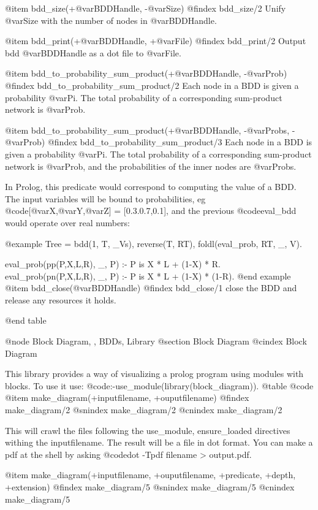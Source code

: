 @item bdd_size(+@var{BDDHandle}, -@var{Size})
@findex bdd_size/2
Unify @var{Size} with the number of nodes in @var{BDDHandle}.

@item bdd_print(+@var{BDDHandle}, +@var{File})
@findex bdd_print/2
Output bdd @var{BDDHandle} as a dot file to @var{File}.

@item bdd_to_probability_sum_product(+@var{BDDHandle}, -@var{Prob})
@findex bdd_to_probability_sum_product/2
Each node in a BDD is given a probability @var{Pi}. The total
probability of a corresponding sum-product network is @var{Prob}.

@item bdd_to_probability_sum_product(+@var{BDDHandle}, -@var{Probs}, -@var{Prob})
@findex bdd_to_probability_sum_product/3
Each node in a BDD is given a probability @var{Pi}. The total
probability of a corresponding sum-product network is @var{Prob}, and
the probabilities of the inner nodes are @var{Probs}.

In Prolog, this predicate would correspond to computing the value of a
BDD. The input variables will be bound to probabilities, eg
@code{[@var{X},@var{Y},@var{Z}] = [0.3.0.7,0.1]}, and the previous
@code{eval_bdd} would operate over real numbers:

@example
    Tree = bdd(1, T, _Vs),
    reverse(T, RT),
    foldl(eval_prob, RT, _, V).

eval_prob(pp(P,X,L,R), _, P) :-
    P is  X * L +  (1-X) * R.
eval_prob(pn(P,X,L,R), _, P) :-
    P is  X * L + (1-X) * (1-R).
@end example
@item bdd_close(@var{BDDHandle})
@findex bdd_close/1
close the BDD and release any resources it holds.

@end table

@node Block Diagram, , BDDs, Library
@section Block Diagram
@cindex Block Diagram

This library provides a way of visualizing a prolog program using
modules with blocks.  To use it use:
@code{:-use_module(library(block_diagram))}.
@table @code
@item make_diagram(+inputfilename, +ouputfilename)
@findex make_diagram/2
@snindex make_diagram/2
@cnindex make_diagram/2

This will crawl the files following the use_module, ensure_loaded directives withing the inputfilename.
The result will be a file in dot format.
You can make a pdf at the shell by asking @code{dot -Tpdf filename > output.pdf}.

@item make_diagram(+inputfilename, +ouputfilename, +predicate, +depth, +extension)
@findex make_diagram/5
@snindex make_diagram/5
@cnindex make_diagram/5

